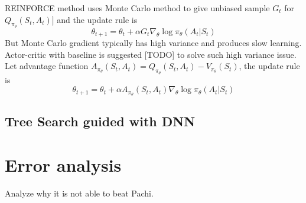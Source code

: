 \documentclass{article}
\begin{document}
REINFORCE method uses Monte Carlo method to give unbiased sample $G_t$ for $Q_{\pi_{\theta}}(S_t, A_t)]$ and the update rule is
$$ \theta_{t+1} = \theta_{t} + \alpha 
G_t 
\nabla_{\theta} \log \pi_{\theta}(A_t|S_t) 
$$
But Monte Carlo gradient typically has high variance and produces slow learning. Actor-critic with baseline is suggested [TODO] to solve such high variance issue. Let advantage function $
A_{\pi_{\theta}}(S_t, A_t) 
= 
Q_{\pi_{\theta}}(S_t, A_t)  - 
V_{\pi_{\theta}}(S_t) 
$, the update rule is
$$ \theta_{t+1} = \theta_{t} + \alpha 
A_{\pi_{\theta}}(S_t, A_t) 
\nabla_{\theta} \log \pi_{\theta}(A_t|S_t) 
$$

\subsection{Tree Search guided with DNN}

\section{Error analysis}
Analyze why it is not able to beat Pachi. 


 

\end{document}
